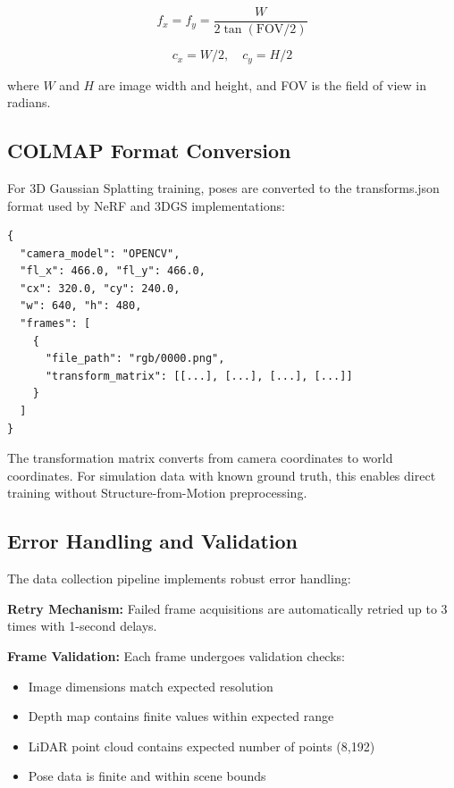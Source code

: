 \begin{equation}
f_x = f_y = \frac{W}{2 \tan(\text{FOV}/2)}
\label{eq:intrinsics}
\end{equation}

\begin{equation}
c_x = W/2, \quad c_y = H/2
\label{eq:principal_point}
\end{equation}

where $W$ and $H$ are image width and height, and FOV is the field of view in radians.

\subsection{COLMAP Format Conversion}

For 3D Gaussian Splatting training, poses are converted to the transforms.json format used by NeRF and 3DGS implementations:

\begin{lstlisting}[language={}, caption={COLMAP Transforms Format}]
{
  "camera_model": "OPENCV",
  "fl_x": 466.0, "fl_y": 466.0,
  "cx": 320.0, "cy": 240.0,
  "w": 640, "h": 480,
  "frames": [
    {
      "file_path": "rgb/0000.png",
      "transform_matrix": [[...], [...], [...], [...]]
    }
  ]
}
\end{lstlisting}

The transformation matrix converts from camera coordinates to world coordinates. For simulation data with known ground truth, this enables direct training without Structure-from-Motion preprocessing.

\subsection{Error Handling and Validation}

The data collection pipeline implements robust error handling:

\textbf{Retry Mechanism:} Failed frame acquisitions are automatically retried up to 3 times with 1-second delays.

\textbf{Frame Validation:} Each frame undergoes validation checks:

\begin{itemize}
    \item Image dimensions match expected resolution
    \item Depth map contains finite values within expected range
    \item LiDAR point cloud contains expected number of points (8,192)
    \item Pose data is finite and within scene bounds
\end{itemize}

